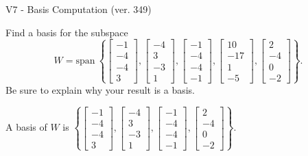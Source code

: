\begin{exercise}
  \begin{exerciseTitle}V7 - Basis Computation (ver. 349)\end{exerciseTitle}
  \begin{exerciseStatement}
    Find a basis for the subspace 
\[W=\mathrm{span}\ \left\{\left[\begin{array}{r}
-1 \\
-4 \\
-4 \\
3
\end{array}\right] , \left[\begin{array}{r}
-4 \\
3 \\
-3 \\
1
\end{array}\right] , \left[\begin{array}{r}
-1 \\
-4 \\
-4 \\
-1
\end{array}\right] , \left[\begin{array}{r}
10 \\
-17 \\
1 \\
-5
\end{array}\right] , \left[\begin{array}{r}
2 \\
-4 \\
0 \\
-2
\end{array}\right]\right\}.\]
 Be sure to explain why your result is a basis.


  \end{exerciseStatement}
  \begin{exerciseAnswer}
   A basis of \(W\) is  \(\left\{\left[\begin{array}{r}
-1 \\
-4 \\
-4 \\
3
\end{array}\right] , \left[\begin{array}{r}
-4 \\
3 \\
-3 \\
1
\end{array}\right] , \left[\begin{array}{r}
-1 \\
-4 \\
-4 \\
-1
\end{array}\right] , \left[\begin{array}{r}
2 \\
-4 \\
0 \\
-2
\end{array}\right]\right\}\).
  


  \end{exerciseAnswer}
\end{exercise}